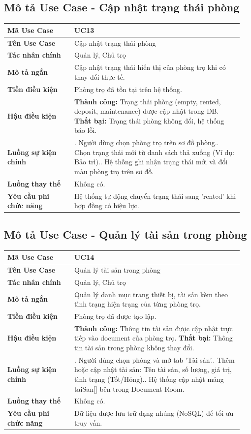\documentclass[a4paper,oneside]{report}
\begin{document}
\subsection{Mô tả Use Case - Cập nhật trạng thái phòng}

\begin{longtable}[]{@{}>{\RaggedRight\arraybackslash}p{0.27\linewidth}>{\RaggedRight\arraybackslash}p{0.68\linewidth}@{}}
\toprule
\textbf{Mã Use Case} & UC13\tabularnewline
\midrule
\endhead
\textbf{Tên Use Case} & Cập nhật trạng thái phòng\tabularnewline
\textbf{Tác nhân chính} & Quản lý, Chủ trọ\tabularnewline
\textbf{Mô tả ngắn} & Cập nhật trạng thái hiển thị của phòng trọ khi có
thay đổi thực tế.\tabularnewline
\textbf{Tiền điều kiện} & Phòng trọ đã tồn tại trên hệ
thống.\tabularnewline
\textbf{Hậu điều kiện} & \textbf{Thành công:} Trạng thái phòng (empty, rented, deposit, maintenance) được cập nhật trong DB.\newline 
\textbf{Thất bại:} Trạng thái phòng không đổi, hệ thống báo lỗi.\tabularnewline
\textbf{Luồng sự kiện chính} & 1. Người dùng chọn
phòng trọ trên sơ đồ phòng.\newline 2. Chọn trạng thái mới từ danh
sách thả xuống (Ví dụ: Bảo trì).\newline 3. Hệ thống ghi nhận trạng
thái mới và đổi màu phòng trọ trên sơ đồ.\tabularnewline
\textbf{Luồng thay thế} & Không có.\tabularnewline
\textbf{Yêu cầu phi chức năng} & Hệ thống tự động chuyển trạng thái sang
'rented' khi hợp đồng có hiệu lực.\tabularnewline
\bottomrule
\end{longtable}



\subsection{Mô tả Use Case - Quản lý tài sản trong phòng}

\begin{longtable}[]{@{}>{\RaggedRight\arraybackslash}p{0.27\linewidth}>{\RaggedRight\arraybackslash}p{0.68\linewidth}@{}}
\toprule
\textbf{Mã Use Case} & UC14\tabularnewline
\midrule
\endhead
\textbf{Tên Use Case} & Quản lý tài sản trong phòng\tabularnewline
\textbf{Tác nhân chính} & Quản lý, Chủ trọ\tabularnewline
\textbf{Mô tả ngắn} & Quản lý danh mục trang thiết bị, tài sản kèm theo
tình trạng hiện trạng của từng phòng trọ.\tabularnewline
\textbf{Tiền điều kiện} & Phòng trọ đã được tạo lập.\tabularnewline
\textbf{Hậu điều kiện} & \textbf{Thành công:} Thông tin tài sản được cập nhật trực tiếp vào document của phòng trọ.\newline 
\textbf{Thất bại:} Thông tin tài sản trong phòng không thay đổi.\tabularnewline
\textbf{Luồng sự kiện chính} & 1. Người dùng chọn
phòng và mở tab 'Tài sản'.\newline 2. Thêm hoặc cập nhật tài sản:
Tên tài sản, số lượng, giá trị, tình trạng (Tốt/Hỏng).\newline 3.
Hệ thống cập nhật mảng taiSan{[}{]} bên trong Document
Room.\tabularnewline
\textbf{Luồng thay thế} & Không có.\tabularnewline
\textbf{Yêu cầu phi chức năng} & Dữ liệu được lưu trữ dạng nhúng (NoSQL)
để tối ưu truy vấn.\tabularnewline
\bottomrule
\end{longtable}
\end{document}
